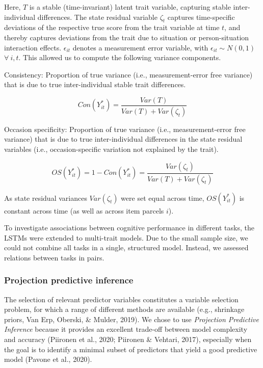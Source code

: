 \documentclass[
  man,floatsintext]{apa6}
\begin{document}
Here, \(T\) is a stable (time-invariant) latent trait variable, capturing stable inter-individual differences. The state residual variable \(\zeta_t\) captures time-specific deviations of the respective true score from the trait variable at time \(t\), and thereby captures deviations from the trait due to situation or person-situation interaction effects. \(\epsilon_{it}\) denotes a measurement error variable, with \(\epsilon_{it} \sim N(0,1)\) \(\forall~ i,t\). This allowed us to compute the following variance components.

Consistency: Proportion of true variance (i.e., measurement-error free variance) that is due to true inter-individual stable trait differences.

\begin{equation}
Con(Y^*_{it})=\frac{Var(T)}{Var(T)+Var(\zeta_t)}
\end{equation}

Occasion specificity: Proportion of true variance (i.e., measurement-error free variance) that is due to true inter-individual differences in the state residual variables (i.e., occasion-specific variation not explained by the trait).

\begin{equation}
OS(Y^*_{it})=1-Con(Y^*_{it}) = \frac{Var(\zeta_t)}{Var(T)+Var(\zeta_t)}
\end{equation}

As state residual variances \(Var(\zeta_t)\) were set equal across time, \(OS(Y^*_{it})\) is constant across time (as well as across item parcels \(i\)).

To investigate associations between cognitive performance in different tasks, the LSTMs were extended to multi-trait models. Due to the small sample size, we could not combine all tasks in a single, structured model. Instead, we assessed relations between tasks in pairs.

\hypertarget{projection-predictive-inference}{%
\subsubsection{Projection predictive inference}\label{projection-predictive-inference}}

The selection of relevant predictor variables constitutes a variable selection problem, for which a range of different methods are available (e.g., shrinkage priors, Van Erp, Oberski, \& Mulder, 2019). We chose to use \emph{Projection Predictive Inference} because it provides an excellent trade-off between model complexity and accuracy (Piironen et al., 2020; Piironen \& Vehtari, 2017), especially when the goal is to identify a minimal subset of predictors that yield a good predictive model (Pavone et al., 2020).
\end{document}
